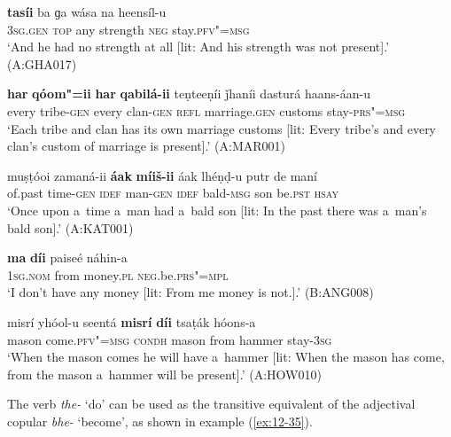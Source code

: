\begin{exe}
\ex
\label{ex:12-30}
\gll \textbf{tasíi} ba ɡa wása na heensíl-u \\
\textsc{3sg.gen} \textsc{top} any strength \textsc{neg} stay.\textsc{pfv"=msg} \\
\glt `And he had no strength at all [lit: And his strength was not present].' (A:GHA017)
\end{exe}
\begin{exe}
\ex
\label{ex:12-31}
\gll \textbf{har} \textbf{qóom"=ii} \textbf{har} \textbf{qabilá-ii} teṇteeṇíi ǰhaníi dasturá haans-áan-u\\
every tribe-\textsc{gen} every clan-\textsc{gen} \textsc{refl} marriage.\textsc{gen}  customs stay-\textsc{prs"=msg}\\
\glt `Each tribe and clan has its own marriage customs [lit: Every tribe's and every clan's custom of marriage is present].' (A:MAR001)

\ex
\label{ex:12-32}
\gll muṣṭóoi zamaná-ii \textbf{áak} \textbf{míiš-ii} áak lhéṇḍ-u putr de maní \\
of.past time-\textsc{gen} \textsc{idef} man-\textsc{gen} \textsc{idef} bald-\textsc{msg} son be.\textsc{pst} \textsc{hsay} \\
\glt `Once upon a~time a~man had a~bald son [lit: In the past there was a~man's bald son].' (A:KAT001)
\end{exe}
\begin{exe}
\ex
\label{ex:12-33}
\gll \textbf{ma} \textbf{díi} paiseé náhin-a \\
\textsc{1sg.nom} from money.\textsc{pl} \textsc{neg}.be.\textsc{prs"=mpl} \\
\glt `I don't have any money [lit: From me money is not.].' (B:ANG008)
\end{exe}
\begin{exe}
\ex
\label{ex:12-34}
\gll misrí yhóol-u seentá \textbf{misrí} \textbf{díi} tsaṭák hóons-a \\
mason come.\textsc{pfv"=msg} \textsc{condh} mason from hammer stay-\textsc{3sg} \\
\glt `When the mason comes he will have a~hammer [lit: When the mason has come, from the mason a~hammer will be present].' (A:HOW010)
\end{exe}

 The verb \textit{the-} `do' can be used as the transitive equivalent of the adjectival copular \textit{bhe-} `become', as shown in example (\ref{ex:12-35}).

